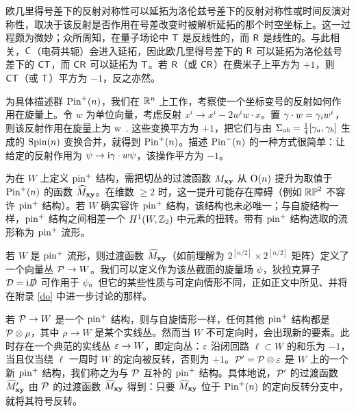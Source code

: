 
欧几里得号差下的反射对称性可以延拓为洛伦兹号差下的反射对称性或时间反演对称性，取决于该反射是否作用在号差改变时被解析延拓的那个时空坐标上。这一过程颇为微妙；众所周知，在量子场论中 $\sT$ 是反线性的，而 $\sR$ 是线性的。与此相关，$\sC$（电荷共轭）会进入延拓，因此欧几里得号差下的 $\sR$ 可以延拓为洛伦兹号差下的 $\sCT$，而 $\sCR$ 可以延拓为 $\sT$。若 $\sR$（或 $\sCR$）在费米子上平方为 $+1$，则 $\sCT$（或 $\sT$）平方为 $-1$，反之亦然。

为具体描述群 $\Pin^+(n)$，我们在 $\R^n$ 上工作，考察使一个坐标变号的反射如何作用在旋量上。令 $w$ 为单位向量，考虑反射 $x^i \to x^i -2w^i w\cdot x$。置 $\g\cdot w=\g_i w^i$，则该反射作用在旋量上为
\be\label{bel}\psi\to \g\cdot w\, \psi.\ee
这些变换平方为 $+1$，把它们与由 $\Sigma_{ab}=\frac{1}{4}[\g_a,\g_b]$ 生成的 $\Spin(n)$ 变换合并，就得到 $\Pin^+(n)$。描述 $\Pin^-(n)$ 的一种方式很简单：让给定的反射作用为 $\psi\to \i \g\cdot w\psi$，该操作平方为 $-1$。

为在 $W$ 上定义 $\pin^+$ 结构，需把切丛的过渡函数 $M_{\x\y}$ 从 $\O(n)$ 提升为取值于 $\Pin^+(n)$ 的函数 $\h M_{\x\y}$。在维数 $\geq 2$ 时，这一提升可能存在障碍（例如 $\RP^2$ 不容许 $\pin^+$ 结构）。若 $W$ 确实容许 $\pin^+$ 结构，该结构也未必唯一；与自旋结构一样，$\pin^+$ 结构之间相差一个 $H^1(W,\Z_2)$ 中元素的扭转。带有 $\pin^+$ 结构选取的流形称为 $\pin^+$ 流形。

若 $W$ 是 $\pin^+$ 流形，则过渡函数 $\h M_{\x\y}$（如前理解为 $2^{[n/2]}\times 2^{[n/2]}$ 矩阵）定义了一个向量丛 $\P\to W$。我们可以定义作为该丛截面的旋量场 $\psi$，狄拉克算子 $\D=\i\slashed{D}$ 可作用于 $\psi$。但它的某些性质与可定向情形不同，正如正文中所见、并将在附录 \ref{do} 中进一步讨论的那样。

若 $\P\to W$ 是一个 $\pin^+$ 结构，则与自旋情形一样，任何其他 $\pin^+$ 结构都是 $\P\otimes \rho$，其中 $\rho\to W$ 是某个实线丛。然而当 $W$ 不可定向时，会出现新的要素。此时存在一个典范的实线丛 $\veps\to W$，即定向丛：$\veps$ 沿闭回路 $\ell\subset W$ 的和乐为 $-1$，当且仅当绕 $\ell$ 一周时 $W$ 的定向被反转，否则为 $+1$。$\P'=\P\otimes \veps$ 是 $W$ 上的一个新 $\pin^+$ 结构，我们称之为与 $\P$ 互补的 $\pin^+$ 结构。具体地说，$\P'$ 的过渡函数 $\h M'_{\x\y}$ 由 $\P$ 的过渡函数 $\h M_{\x\y}$ 得到：只要 $\h M_{\x\y}$ 位于 $\Pin^+(n)$ 的定向反转分支中，就将其符号反转。

